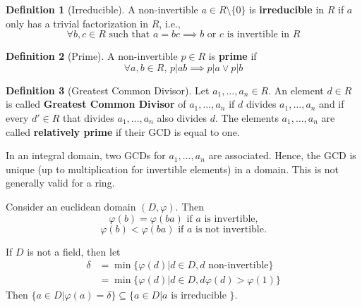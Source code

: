 \documentclass[12pt,a4paper]{article}
\theoremstyle{definition}
\newtheorem{definition}{Definition}[section]
\begin{document}
\begin{definition}[Irreducible]
A non-invertible $a \in R \setminus \{ 0 \}$ is \textbf{irreducible} in $R$ if $a$ only has a trivial factorization in $R$, i.e.,
\[
\forall b, c \in R \text{ such that } a = bc \implies b \text{ or } c \text{ is invertible in } R
\]
\end{definition}

\begin{definition}[Prime]
A non-invertible $p \in R$ is \textbf{prime} if
\[
\forall a, b \in R, \, p|ab \implies p|a \lor p|b
\]
\end{definition}

\begin{definition}[Greatest Common Divisor]
Let $a_1, \ldots, a_n \in R$. An element $d \in R$ is called \textbf{Greatest Common Divisor} of $a_1, \ldots, a_n$ if $d$ divides $a_1, \ldots, a_n$ and if every $d' \in R$ that divides $a_1, \ldots, a_n$ also divides $d$. The elements $a_1, \ldots, a_n$ are called \textbf{relatively prime} if their GCD is equal to one.
\end{definition}

In an integral domain, two GCDs for $a_1, \ldots, a_n$ are associated. Hence, the GCD is unique (up to multiplication for invertible elements) in a domain. This is not generally valid for a ring.

Consider an euclidean domain $(D, \varphi)$. Then 
\[
\varphi (b) = \varphi (ba) \text{ if $a$ is invertible,}
\]
\[
\varphi (b) < \varphi (ba) \text{ if $a$ is not invertible.}
\]

If $D$ is not a field, then let
\begin{equation*}
\begin{aligned}
\delta & = \min \{ \varphi (d) | d \in D, d \text{ non-invertible} \} \\
& = \min \{ \varphi (d) | d \in D, d \varphi (d) > \varphi (1) \}
\end{aligned}
\end{equation*}
Then $\{ a \in D | \varphi (a) = \delta \} \subseteq \{ a \in D | a \text{ is irreducible } \}$.
\end{document}
